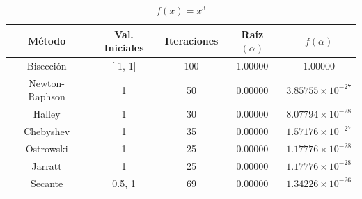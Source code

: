 \begin{table}[H]
\centering

\renewcommand{\arraystretch}{1.3} %
\setlength{\tabcolsep}{12pt}      %

\begin{tabular}{ccccc}
\hline
Método & Val. Iniciales & Iteraciones & Raíz $(\alpha)$ & $f(\alpha)$ \\
\hline

Bisección      & [-1, 1] & 100 & 1.00000 & $1.00000$            \\

Newton-Raphson & 1       &  50 & 0.00000 & $3.85755\times10^{-27}$ \\

Halley         & 1       &  30 & 0.00000 & $8.07794\times10^{-28}$ \\

Chebyshev      & 1       &  35 & 0.00000 & $1.57176\times10^{-27}$ \\

Ostrowski      & 1       &  25 & 0.00000 & $1.17776\times10^{-28}$ \\

Jarratt        & 1       &  25 & 0.00000 & $1.17776\times10^{-28}$ \\

Secante        & 0.5, 1  &  69 & 0.00000 & $1.34226\times10^{-26}$ \\

\hline
\end{tabular}

\caption{$f(x) = x^{3}$}
\end{table}


